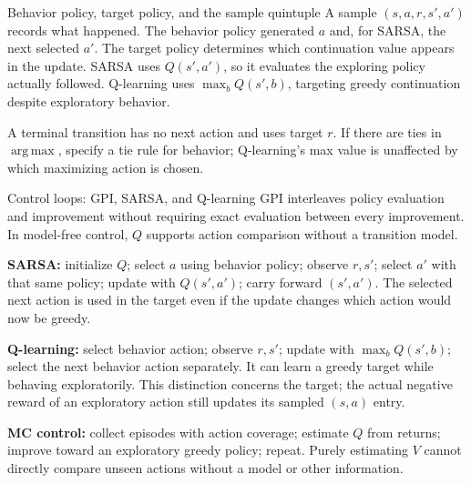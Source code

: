 \documentclass[10pt,a4paper]{article}
\newcommand{\argmax}{\operatorname*{arg\,max}}
\begin{document}
\begin{card}{Behavior policy, target policy, and the sample quintuple}
A sample $(s,a,r,s',a')$ records what happened. The behavior policy generated $a$ and, for SARSA, the next selected $a'$. The target policy determines which continuation value appears in the update. SARSA uses $Q(s',a')$, so it evaluates the exploring policy actually followed. Q-learning uses $\max_bQ(s',b)$, targeting greedy continuation despite exploratory behavior.

A terminal transition has no next action and uses target $r$. If there are ties in $\argmax$, specify a tie rule for behavior; Q-learning's max value is unaffected by which maximizing action is chosen.
\end{card}
\begin{card}{Control loops: GPI, SARSA, and Q-learning}
GPI interleaves policy evaluation and improvement without requiring exact evaluation between every improvement. In model-free control, $Q$ supports action comparison without a transition model.

\textbf{SARSA:} initialize $Q$; select $a$ using behavior policy; observe $r,s'$; select $a'$ with that same policy; update with $Q(s',a')$; carry forward $(s',a')$. The selected next action is used in the target even if the update changes which action would now be greedy.

\textbf{Q-learning:} select behavior action; observe $r,s'$; update with $\max_bQ(s',b)$; select the next behavior action separately. It can learn a greedy target while behaving exploratorily. This distinction concerns the target; the actual negative reward of an exploratory action still updates its sampled $(s,a)$ entry.

\textbf{MC control:} collect episodes with action coverage; estimate $Q$ from returns; improve toward an exploratory greedy policy; repeat. Purely estimating $V$ cannot directly compare unseen actions without a model or other information.
\end{card}
\end{document}
